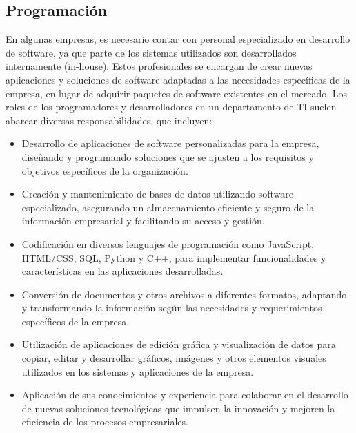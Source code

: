 \documentclass{article}
\begin{document}
\subsection{Programación}
En algunas empresas, es necesario contar con personal especializado en desarrollo de software, ya que parte de los sistemas utilizados son desarrollados internamente (in-house). Estos profesionales se encargan de crear nuevas aplicaciones y soluciones de software adaptadas a las necesidades específicas de la empresa, en lugar de adquirir paquetes de software existentes en el mercado.
Los roles de los programadores y desarrolladores en un departamento de TI suelen abarcar diversas responsabilidades, que incluyen:
\begin{itemize}[label=$\circ$]
    \item Desarrollo de aplicaciones de software personalizadas para la empresa, diseñando y programando soluciones que se ajusten a los requisitos y objetivos específicos de la organización.
    \item Creación y mantenimiento de bases de datos utilizando software especializado, asegurando un almacenamiento eficiente y seguro de la información empresarial y facilitando su acceso y gestión.
    \item Codificación en diversos lenguajes de programación como JavaScript, HTML/CSS, SQL, Python y C++, para implementar funcionalidades y características en las aplicaciones desarrolladas.
    \item Conversión de documentos y otros archivos a diferentes formatos, adaptando y transformando la información según las necesidades y requerimientos específicos de la empresa.
    \item Utilización de aplicaciones de edición gráfica y visualización de datos para copiar, editar y desarrollar gráficos, imágenes y otros elementos visuales utilizados en los sistemas y aplicaciones de la empresa.
    \item Aplicación de sus conocimientos y experiencia para colaborar en el desarrollo de nuevas soluciones tecnológicas que impulsen la innovación y mejoren la eficiencia de los procesos empresariales.    
\end{itemize}
\end{document}
